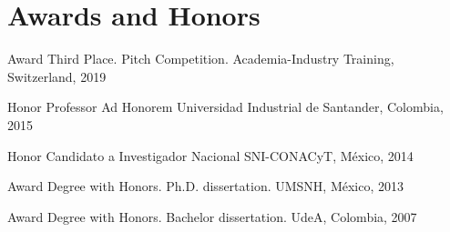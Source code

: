 \documentclass[]{friggeri-cv}
\begin{document}
\section{Awards and Honors}
\begin{entrylist}

\entry 
{Award}
{Third Place. Pitch Competition.}
{Academia-Industry Training, Switzerland, 2019}

\entry 
{Honor}
{Professor Ad Honorem}
{Universidad Industrial de Santander, Colombia, 2015}

\entry 
{Honor}
{Candidato a Investigador Nacional}
{SNI-CONACyT, M\'exico, 2014}

\entry 
{Award}
{Degree with Honors. Ph.D. dissertation.}
{UMSNH, M\'exico, 2013}

\entry 
{Award}
{Degree with Honors. Bachelor dissertation.}
{UdeA, Colombia, 2007}







\end{entrylist}
\end{document}
